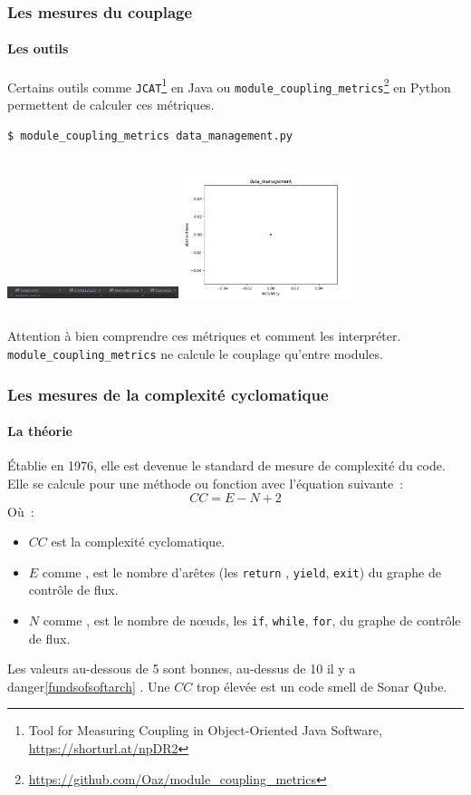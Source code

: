 \documentclass{beamer}
\begin{document}
    \begin{frame}[fragile]
        \transdissolve
        \frametitle{Les mesures du couplage}
        \framesubtitle{Les outils}
        Certains outils comme \lstinline{JCAT}\footnote{Tool for Measuring Coupling in Object-Oriented Java Software, \url{https://shorturl.at/npDR2}} en Java ou \lstinline{module_coupling_metrics}\footnote{\url{https://github.com/Oaz/module_coupling_metrics}} en Python permettent de calculer ces métriques.
        \begin{lstlisting}[language=bash]
$ module_coupling_metrics data_management.py
        \end{lstlisting}
        \begin{columns}
            \centering
            \includegraphics[width=5cm]{image/data-management-metrics-table}
            \centering
            \includegraphics[width=5cm]{image/data-management-disance-chart}
        \end{columns}

        Attention à bien comprendre ces métriques et comment les interpréter.
        \lstinline{module_coupling_metrics} ne calcule le couplage qu'entre modules.
        \bigbreak
    \end{frame}

    \begin{frame}
        \transdissolve
        \frametitle{Les mesures de la complexité cyclomatique}
        \framesubtitle{La théorie}
        Établie en 1976, elle est devenue le standard de mesure de complexité du code.
        \bigbreak
        Elle se calcule pour une méthode ou fonction avec l'équation suivante~:
        \begin{equation}
            CC = E - N + 2
        \end{equation}
        Où~:
        \begin{itemize}
            \item $CC$ est la complexité cyclomatique.
            \item $E$ comme  , est le nombre d'arêtes (les \lstinline{return} , \lstinline{yield}, \lstinline{exit}) du graphe de contrôle de flux.
            \item $N$ comme  , est le nombre de nœuds, les \lstinline{if}, \lstinline{while}, \lstinline{for}, du graphe de contrôle de flux.
        \end{itemize}
        \bigbreak
        Les valeurs au-dessous de 5 sont bonnes, au-dessus de 10 il y a danger\cref{fundsofsoftarch} .
        \bigbreak
        Une $CC$ trop élevée est un code smell de Sonar Qube.
    \end{frame}
\end{document}
